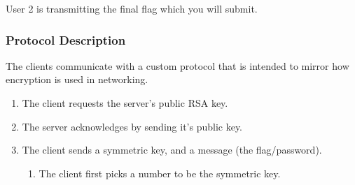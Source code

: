 {User 2 is transmitting the final flag which you will submit. 















                \subsubsection*{Protocol Description}







                    The clients communicate with a custom protocol that is intended to mirror how encryption is used in networking. 







                    \begin{enumerate}







                        \item The client requests the server's public RSA key.







                        \item The server acknowledges by sending it's public key.







                        \item The client sends a symmetric key, and a message (the flag/password).







                        \begin{enumerate}[1.]







                            \item The client first picks a number to be the symmetric key.








\end{enumerate}
\end{enumerate}}
